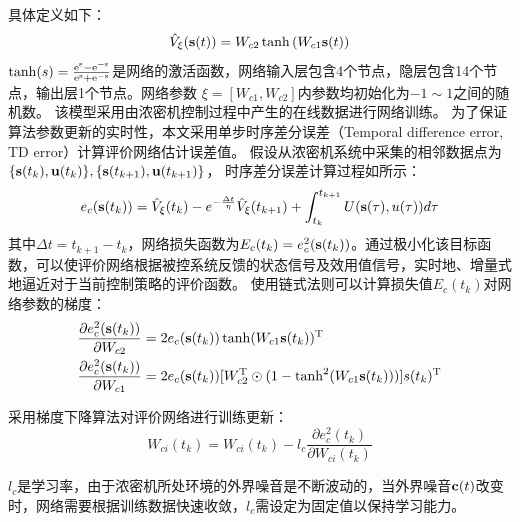   具体定义如下：
\begin{equation}
\label{equ:criticNN} \hat { V }_\xi ( \mathbf s(t) ) = W _ { c 2 } \tanh \left( W _
{ c 1 }  \mathbf s(t)  \right)
\end{equation}
$\tanh(s)=\frac{\rm e^{s}-\rm e^{-s}}{\rm e^{s}+\rm
e^{-s}}$是网络的激活函数，网络输入层包含4个节点，隐层包含14个节点，输出层1个节点。网络参数
$\xi=[W _ { c 1 }, W _ { c 2 }]$内参数均初始化为$-1\sim 1$之间的随机数。
该模型采用由浓密机控制过程中产生的在线数据进行网络训练。
为了保证算法参数更新的实时性，本文采用单步时序差分误差（Temporal difference error, TD error）\cite{Sutton2018}计算评价网络估计误差值。
假设从浓密机系统中采集的相邻数据点为$\{\mathbf s(t_k), \mathbf u(t_k)\},\{\mathbf s(t_{k+1}), \mathbf u(t_{k+1})\}$，
时序差分误差计算过程如所示：
\begin{equation}
\label{equ:TDerror} e_{c }(\mathbf s(t_k))=\hat{V}_{\xi}(t_k)-e^{-\frac{\Delta t}{\eta}} \hat{V}_{\xi}(t_{k+1})+\int_{t_k}^{t_{k+1}}U(\mathbf s(\tau), u(\tau))d \tau
\end{equation}
其中$\Delta t=t_{k+1}-t_{k}$，网络损失函数为$E_c(t_k)=e_c^2(\mathbf s(t_k))$。通过极小化该目标函数，可以使评价网络根据被控系统反馈的状态信号及效用值信号，实时地、增量式地逼近对于当前控制策略的评价函数。
使用链式法则可以计算损失值$E_c(t_k)$对网络参数的梯度：
\begin{equation}
\begin{aligned}
\label{equ:critic_gradient} \dfrac{\partial e_c^2(\mathbf s(t_k))}{\partial
W_{c2}} & =2e_c(\mathbf s(t_k)) \tanh(W_{c1}\mathbf s(t_k))^{\rm T} 
\\ \dfrac{\partial
e_c^2(\mathbf s(t_k))}{\partial W_{c1}} & =2e_c(\mathbf s(t_k)) [W_{c2}^{\rm
T}\odot(1-\tanh^2(W_{c1}\mathbf s(t_k)))]\mathbf {\mathbf} s(t_k)^{\rm T}
\end{aligned}
\end{equation}

采用梯度下降算法对评价网络进行训练更新：
\begin{equation}
\label{equ:train_critic} W_{ci}(t_k)=W_{ci}(t_k)-l_{c} \frac{\partial
e_{c }^{2}(t_k)}{\partial W_{ci}(t_k)}
\end{equation}

$l_c$是学习率，由于浓密机所处环境的外界噪音是不断波动的，当外界噪音$\mathbf
c(t)$改变时，网络需要根据训练数据快速收敛，$l_c$需设定为固定值以保持学习能力。

